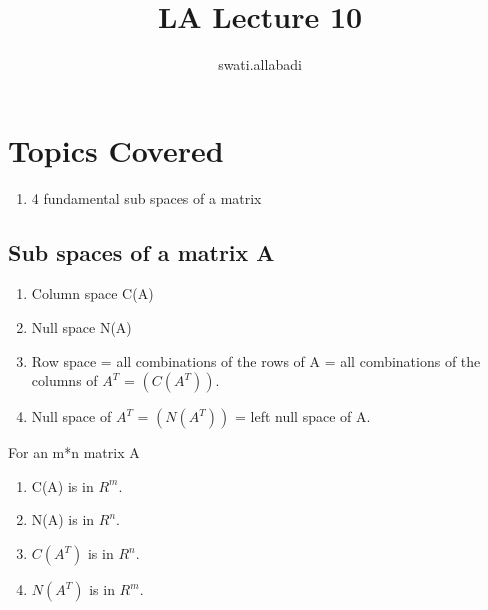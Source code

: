 \documentclass{article}
\title{LA Lecture 10}
\author{swati.allabadi }
\date{}
\begin{document}
\maketitle

\section{Topics Covered}

\begin{enumerate}
    \item 4 fundamental sub spaces of a matrix
\end{enumerate}

\subsection{Sub spaces of a matrix A}
\begin{enumerate}
    \item Column space C(A)
    \item Null space N(A)
    \item Row space = all combinations of the rows of A = all combinations of the columns of $A^T$ = $(C(A^T))$.
    \item Null space of $A^T$ = $(N(A^T))$ = left null space of A.
\end{enumerate}
For an m*n matrix A
\begin{enumerate}
    \item C(A) is in $R^m$.
    \item N(A) is in $R^n$.
    \item $C(A^T)$ is in $R^n$.
    \item $N(A^T)$ is in $R^m$.
\end{enumerate}
\end{document}
